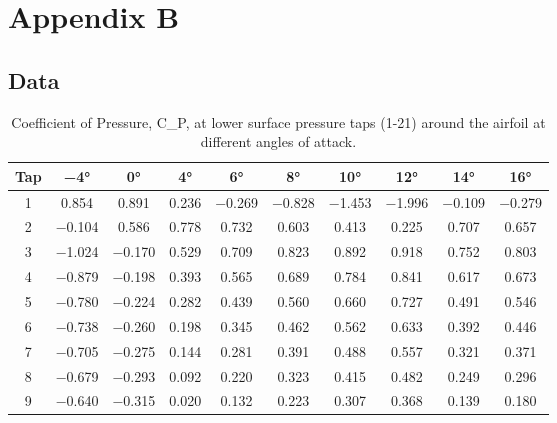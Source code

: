 \chapter{Appendix B}

\section{Data}\label{sec:data}
\begin{table}[htpb]
    \caption{Coefficient of Pressure, \gls{C_P}, at lower surface pressure taps (1-21) around the airfoil at different angles of attack.}
    \label{tab:C_P_lower_data}
    \centering
    \begin{tabular}{cccccccccc}
        \toprule
        Tap & \num{-4}\unit{\degree} & \num{0}\unit{\degree} & \num{4}\unit{\degree} & \num{6}\unit{\degree} & \num{8}\unit{\degree} & \num{10}\unit{\degree} & \num{12}\unit{\degree} & \num{14}\unit{\degree} & \num{16}\unit{\degree} \\
        \midrule
\num{1} & \num{0.854} & \num{0.891} & \num{0.236} & \num{-0.269} & \num{-0.828} & \num{-1.453} & \num{-1.996} & \num{-0.109} & \num{-0.279} \\
\num{2} & \num{-0.104} & \num{0.586} & \num{0.778} & \num{0.732} & \num{0.603} & \num{0.413} & \num{0.225} & \num{0.707} & \num{0.657} \\
\num{3} & \num{-1.024} & \num{-0.170} & \num{0.529} & \num{0.709} & \num{0.823} & \num{0.892} & \num{0.918} & \num{0.752} & \num{0.803} \\
\num{4} & \num{-0.879} & \num{-0.198} & \num{0.393} & \num{0.565} & \num{0.689} & \num{0.784} & \num{0.841} & \num{0.617} & \num{0.673} \\
\num{5} & \num{-0.780} & \num{-0.224} & \num{0.282} & \num{0.439} & \num{0.560} & \num{0.660} & \num{0.727} & \num{0.491} & \num{0.546} \\
\num{6} & \num{-0.738} & \num{-0.260} & \num{0.198} & \num{0.345} & \num{0.462} & \num{0.562} & \num{0.633} & \num{0.392} & \num{0.446} \\
\num{7} & \num{-0.705} & \num{-0.275} & \num{0.144} & \num{0.281} & \num{0.391} & \num{0.488} & \num{0.557} & \num{0.321} & \num{0.371} \\
\num{8} & \num{-0.679} & \num{-0.293} & \num{0.092} & \num{0.220} & \num{0.323} & \num{0.415} & \num{0.482} & \num{0.249} & \num{0.296} \\
\num{9} & \num{-0.640} & \num{-0.315} & \num{0.020} & \num{0.132} & \num{0.223} & \num{0.307} & \num{0.368} & \num{0.139} & \num{0.180} \\

\end{tabular}
\end{table}
